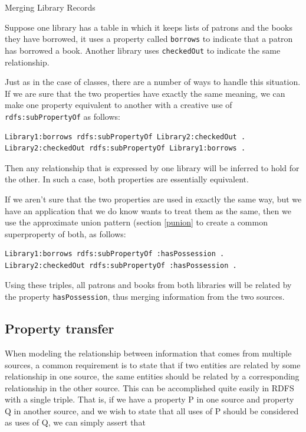 \begin{example}{Merging Library Records}

Suppose one library has a table in which it keeps lists of patrons and
the books they have borrowed, it uses a property called \texttt{borrows} to
indicate that a patron has borrowed a book. Another library uses
\texttt{checkedOut} to indicate the same relationship.

Just as in the case of classes, there are a number of ways to handle
this situation. If we are sure that the two
properties have exactly the same meaning, we can make one property
equivalent to another with a creative use of \texttt{rdfs:subPropertyOf} as
follows:

\begin{lstlisting}
Library1:borrows rdfs:subPropertyOf Library2:checkedOut .
Library2:checkedOut rdfs:subPropertyOf Library1:borrows .
\end{lstlisting}

Then any relationship that is expressed by one library will be inferred
to hold for the other. In such a case, both properties are essentially
equivalent.

If we aren't sure that the two properties are used in exactly the same
way, but we have an application that
we do know wants to treat them as the same, then we use the approximate union
pattern (section \ref{punion} to create a common superproperty of both, as follows:

\begin{lstlisting}
Library1:borrows rdfs:subPropertyOf :hasPossession .
Library2:checkedOut rdfs:subPropertyOf :hasPossession .
\end{lstlisting}

Using these triples, all patrons and books from both libraries will be
related by the property \texttt{hasPossession}, thus merging information from the
two sources.
\end{example}

\subsection{Property transfer}

When modeling the relationship between information that comes from
multiple sources, a common requirement is to state that if two entities
are related by some relationship in one source, the same entities should
be related by a corresponding relationship in the other source. This can
be accomplished quite easily in RDFS with a single triple. That is, if
we have a property P in one source and property Q in another source, and
we wish to state that all uses of P should be considered as uses of Q,
we can simply assert that

